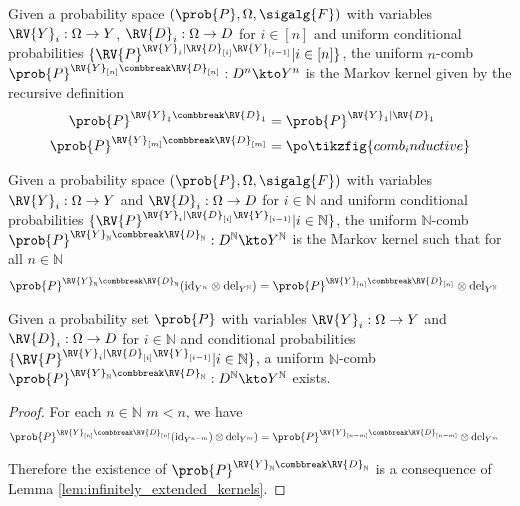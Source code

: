 \begin{definition}[$n$-Comb]\label{def:uniform_comb}
Given a probability space $(\prob{P},\Omega,\sigalg{F})$ with variables $\RV{Y}_i:\Omega\to Y$, $\RV{D}_i:\Omega\to D$ for $i\in [n]$ and uniform conditional probabilities $\{\RV{P}^{\RV{Y}_i|\RV{D}_{[i]}\RV{Y}_{[i-1]}}|i\in [n]\}$, the uniform $n$-comb $\prob{P}^{\RV{Y}_{[n]}\combbreak \RV{D}_{[n]}}:D^n\kto Y^n$ is the Markov kernel given by the recursive definition
\begin{align}
    \prob{P}^{\RV{Y}_{1}\combbreak \RV{D}_{1}} &= \prob{P}^{\RV{Y}_1|\RV{D}_1}\\
    \prob{P}^{\RV{Y}_{[m]}\combbreak \RV{D}_{[m]}} &= \po\tikzfig{comb_inductive}
\end{align}
\end{definition}

\begin{definition}
Given a probability space $(\prob{P},\Omega,\sigalg{F})$ with variables $\RV{Y}_i:\Omega\to Y$ and $\RV{D}_i:\Omega\to D$ for $i\in \mathbb{N}$ and uniform conditional probabilities $\{\RV{P}^{\RV{Y}_i|\RV{D}_{[i]}\RV{Y}_{[i-1]}}|i\in \mathbb{N}\}$, the uniform $\mathbb{N}$-comb $\prob{P}^{\RV{Y}_{\mathbb{N}}\combbreak \RV{D}_{\mathbb{N}}}:D^\mathbb{N}\kto Y^\mathbb{N}$ is the Markov kernel such that for all $n\in \mathbb{N}$
\begin{align}
    \prob{P}^{\RV{Y}_{\mathbb{N}}\combbreak \RV{D}_{\mathbb{N}}}(\mathrm{id}_{Y^{n}}\otimes \mathrm{del}_{Y^{\mathbb{N}}}) &= \prob{P}^{\RV{Y}_{[n]}\combbreak \RV{D}_{[n]}}\otimes \mathrm{del}_{Y^{\mathbb{N}}}
\end{align}
\end{definition}

\begin{theorem}
Given a probability set $\prob{P}$ with variables $\RV{Y}_i:\Omega\to Y$ and $\RV{D}_i:\Omega\to D$ for $i\in \mathbb{N}$ and conditional probabilities $\{\RV{P}^{\RV{Y}_i|\RV{D}_{[i]}\RV{Y}_{[i-1]}}|i\in \mathbb{N}\}$, a uniform $\mathbb{N}$-comb $\prob{P}^{\RV{Y}_{\mathbb{N}}\combbreak \RV{D}_{\mathbb{N}}}:D^\mathbb{N}\kto Y^\mathbb{N}$ exists.
\end{theorem}

\begin{proof}
For each $n\in \mathbb{N}$ $m<n$, we have
\begin{align}
    \prob{P}^{\RV{Y}_{[n]}\combbreak \RV{D}_{[n]}}(\mathrm{id}_{Y^{n-m}})\otimes \mathrm{del}_{Y^m}) &= \prob{P}^{\RV{Y}_{[n-m]}\combbreak \RV{D}_{[n-m]}}\otimes \mathrm{del}_{Y^m}
\end{align}

Therefore the existence of $\prob{P}^{\RV{Y}_{\mathbb{N}}\combbreak \RV{D}_{\mathbb{N}}}$ is a consequence of Lemma \ref{lem:infinitely_extended_kernels}.
\end{proof}

